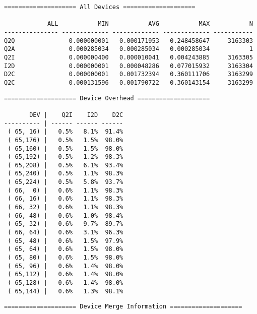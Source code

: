 \begin{verbatim}
==================== All Devices ====================

            ALL           MIN           AVG           MAX           N
--------------- ------------- ------------- ------------- -----------
Q2Q               0.000000001   0.000171953   0.248458647     3163303
Q2A               0.000285034   0.000285034   0.000285034           1
Q2I               0.000000400   0.000010041   0.004243885     3163305
I2D               0.000000001   0.000048286   0.077015932     3163304
D2C               0.000000001   0.001732394   0.360111706     3163299
Q2C               0.000131596   0.001790722   0.360143154     3163299
\end{verbatim}\newpage\begin{verbatim}
==================== Device Overhead ====================

       DEV |    Q2I    I2D    D2C
---------- | ------ ------ ------
 ( 65, 16) |   0.5%   8.1%  91.4%
 ( 65,176) |   0.5%   1.5%  98.0%
 ( 65,160) |   0.5%   1.5%  98.0%
 ( 65,192) |   0.5%   1.2%  98.3%
 ( 65,208) |   0.5%   6.1%  93.4%
 ( 65,240) |   0.5%   1.1%  98.3%
 ( 65,224) |   0.5%   5.8%  93.7%
 ( 66,  0) |   0.6%   1.1%  98.3%
 ( 66, 16) |   0.6%   1.1%  98.3%
 ( 66, 32) |   0.6%   1.1%  98.3%
 ( 66, 48) |   0.6%   1.0%  98.4%
 ( 65, 32) |   0.6%   9.7%  89.7%
 ( 66, 64) |   0.6%   3.1%  96.3%
 ( 65, 48) |   0.6%   1.5%  97.9%
 ( 65, 64) |   0.6%   1.5%  98.0%
 ( 65, 80) |   0.6%   1.5%  98.0%
 ( 65, 96) |   0.6%   1.4%  98.0%
 ( 65,112) |   0.6%   1.4%  98.0%
 ( 65,128) |   0.6%   1.4%  98.0%
 ( 65,144) |   0.6%   1.3%  98.1%
\end{verbatim}\newpage\begin{verbatim}
==================== Device Merge Information ====================


\end{verbatim}
